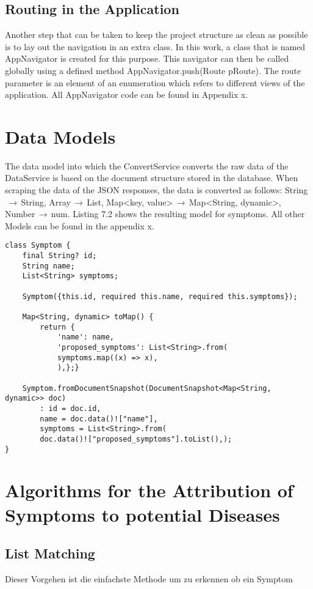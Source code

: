 \subsection{Routing in the Application}
Another step that can be taken to keep the project structure as clean as possible is to lay out the navigation in an extra class. In this work, a class that is named AppNavigator is created for this purpose. This navigator can then be called globally using a defined method AppNavigator.push(Route pRoute). The route parameter is an element of an enumeration which refers to different views of the application. All AppNavigator code can be found in Appendix x.
\section{Data Models}
The data model into which the ConvertService converts the raw data of the DataService is based on the document structure stored in the database. When scraping the data of the JSON responses, the data is converted as follows: String$\,\to\,$String, Array$\,\to\,$List, Map<key, value>$\,\to\,$Map<String, dynamic>, Number$\,\to\,$num. Listing 7.2 shows the resulting model for symptoms. All other Models can be found in the appendix x.
\scriptsize
\begin{lstlisting}[caption=Model for Symptoms]
class Symptom {
	final String? id;
	String name;
	List<String> symptoms;
	
	Symptom({this.id, required this.name, required this.symptoms});
	
	Map<String, dynamic> toMap() {
		return {
			'name': name,
			'proposed_symptoms': List<String>.from(
			symptoms.map((x) => x),
			),};}
	
	Symptom.fromDocumentSnapshot(DocumentSnapshot<Map<String, dynamic>> doc)
		: id = doc.id,
		name = doc.data()!["name"],
		symptoms = List<String>.from(
		doc.data()!["proposed_symptoms"].toList(),);	
}
\end{lstlisting}
\normalsize


\section{Algorithms for the Attribution of Symptoms to potential Diseases}
\subsection{List Matching}
Dieser Vorgehen ist die einfachste Methode um zu erkennen ob ein Symptom 

